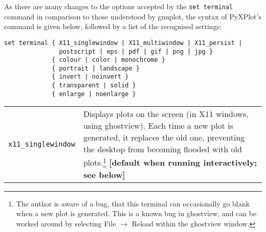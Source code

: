 \documentclass[a4paper,onecolumn,11pt]{book}
\begin{document}
 As there are many
changes to the options accepted by the \texttt{set terminal} command in
comparison to those understood by gnuplot, the syntax of PyXPlot's command is
given below, followed by a list of the recognised settings:

\begin{verbatim} 
set terminal { X11_singlewindow | X11_multiwindow | X11_persist |
               postscript | eps | pdf | gif | png | jpg }
             { colour | color | monochrome }
             { portrait | landscape }
             { invert | noinvert }
             { transparent | solid }
             { enlarge | noenlarge }
\end{verbatim}

\begin{longtable}{p{3cm}p{9cm}}
\texttt{x11\_singlewindow} & Displays plots on the screen (in X11 windows, using ghostview). Each time a new plot is generated, it replaces the old one, preventing the desktop from becoming flooded with old plots.\footnote{The author is aware of a bug, that this terminal can occasionally go blank when a new plot is generated. This is a known bug in ghostview, and can be worked around by selecting File $\to$ Reload within the ghostview window.} \textbf{[default when running interactively; see below]}\\
\end{longtable} %
\end{document}
